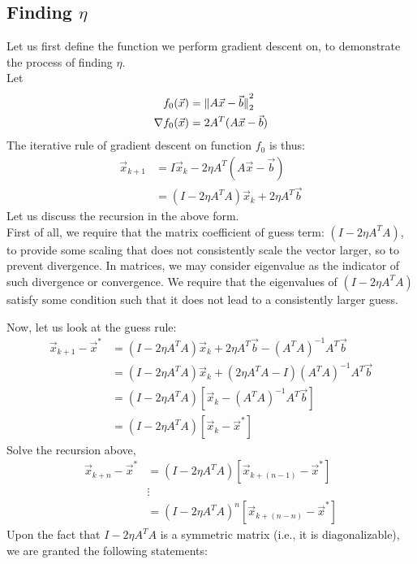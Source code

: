 \subsection{Finding $\eta$}
Let us first define the function we perform gradient descent on, to demonstrate the process of finding $\eta$. \\
Let
\begin{align*}
    f_0 (\vec{x}) &= \pnorm[2]{A \vec{x} - \vec{b}}{2} \\
    \nabla f_0 (\vec{x}) &= 2 A^T (A \vec{x} - \vec{b})
\end{align*}
The iterative rule of gradient descent on function $f_0$ is thus:
\begin{align*}
    \vec{x}_{k + 1}
    &= I \vec{x}_k - 2 \eta A^T (A \vec{x} - \vec{b}) \\
    &= (I - 2 \eta A^T A) \vec{x}_k + 2 \eta A^T \vec{b}
\end{align*}
Let us discuss the recursion in the above form. \\
First of all, we require that the matrix coefficient of guess term: $(I - 2 \eta A^T A)$, to provide some scaling that does not consistently scale the vector larger, so to prevent divergence.
In matrices, we may consider eigenvalue as the indicator of such divergence or convergence. We require that the eigenvalues of $(I - 2 \eta A^T A)$ satisfy some condition such that it does not lead to a consistently larger guess.
\par
Now, let us look at the guess rule:
\begin{align*}
    \vec{x}_{k + 1} - \vec{x}^*
    &= (I - 2 \eta A^T A) \vec{x}_k + 2 \eta A^T \vec{b} - {(A^T A)}^{-1} A^T \vec{b} \\
    &= (I - 2 \eta A^T A) \vec{x}_k + (2 \eta A^T A - I) {(A^T A)}^{-1} A^T \vec{b} \\
    &= (I - 2 \eta A^T A) [\vec{x}_k - {(A^T A)}^{-1} A^T \vec{b}] \\
    &= (I - 2 \eta A^T A) [\vec{x}_k - \vec{x}^*]
\end{align*}
Solve the recursion above,
\begin{align*}
    \vec{x}_{k + n} - \vec{x}^*
    &= (I - 2 \eta A^T A) [\vec{x}_{k + (n - 1)} - \vec{x}^*] \\
    &\vdots \\
    &= {(I - 2 \eta A^T A)}^n [\vec{x}_{k + (n - n)} - \vec{x}^*]
\end{align*}
Upon the fact that $I - 2 \eta A^T A$ is a symmetric matrix (i.e., it is diagonalizable), we are granted the following statements:
